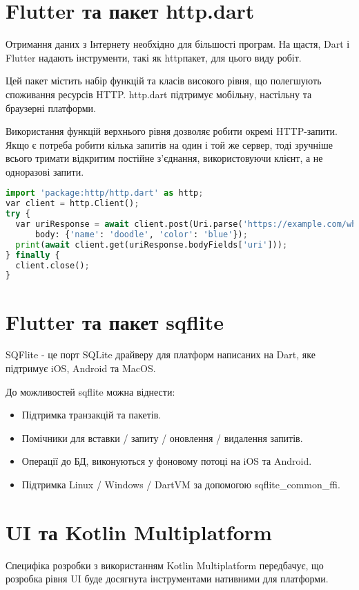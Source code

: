 \section{Flutter та пакет http.dart}
\label{sec:flutter_http_dart_theory}
Отримання даних з Інтернету необхідно для більшості програм.
На щастя, Dart і Flutter надають інструменти, такі як httpпакет, для цього виду робіт.

Цей пакет містить набір функцій та класів високого рівня, що полегшують споживання ресурсів HTTP.
http.dart підтримує мобільну, настільну та браузерні платформи.

Використання функцій верхнього рівня дозволяє робити окремі HTTP-запити.
Якщо є потреба робити кілька запитів на один і той же сервер, тоді зручніше всього тримати відкритим постійне з’єднання,
використовуючи клієнт, а не одноразові запити.

\begin{lstlisting}[style=light, language=Python,label={lst:flutter_pub},caption=Flutter Dependency Resolution]
import 'package:http/http.dart' as http;
var client = http.Client();
try {
  var uriResponse = await client.post(Uri.parse('https://example.com/whatsit/create'),
      body: {'name': 'doodle', 'color': 'blue'});
  print(await client.get(uriResponse.bodyFields['uri']));
} finally {
  client.close();
}
\end{lstlisting}


\section{Flutter та пакет sqflite}
\label{sec:flutter_sqflite_theory}
SQFlite - це порт SQLite драйверу для платформ написаних на Dart, яке підтримує iOS, Android та MacOS.

До можливостей sqflite можна віднести:

\begin{itemize}
    \item Підтримка транзакцій та пакетів.
    \item Помічники для вставки / запиту / оновлення / видалення запитів.
    \item Операції до БД, виконуються у фоновому потоці на iOS та Android.
    \item Підтримка Linux / Windows / DartVM за допомогою sqflite_common_ffi.
\end{itemize}


\section{UI та Kotlin Multiplatform}
\label{sec:kmm_ui}
Специфіка розробки з використанням Kotlin Multiplatform передбачує, що розробка рівня UI буде досягнута
інструментами нативними для платформи.

